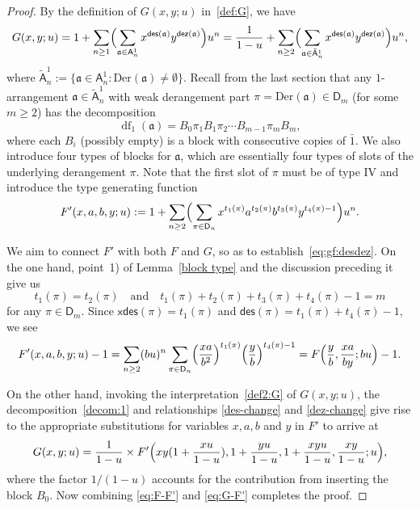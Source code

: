 \documentclass[12pt]{amsart} %
\numberwithin{equation}{section}
\theoremstyle{plain}
\theoremstyle{definition}
\newcommand\A{\mathsf{A}}
\newcommand\D{\mathsf{D}}
\def\dez{\mathsf{dez}}
\def\xdes{\mathsf{xdes}}
\def\Der{\mathrm{Der}}
\def\des{\mathsf{des}}
\def\a{\mathfrak{a}}
\def\df{\operatorname{df}}
\def\neg#1{{{{\bar#1}}}}
\begin{document}
\begin{proof}
By the definition of $G(x,y;u)$ in~\eqref{def:G}, we have 
\begin{equation}\label{def2:G}
G(x,y; u)=1+\sum_{n\geq 1} \Bigl( \sum_{\a\in\A^1_n} 
	 x^{\des(\a)} y^{\dez(\a)} \Bigr) u^n=\frac{1}{1-u}+\sum_{n\geq 2} \Bigl( \sum_{\a\in\tilde{\A}^1_n} 
	 x^{\des(\a)} y^{\dez(\a)} \Bigr) u^n,
\end{equation}
where $\tilde{\A}^1_n:=\{\a\in\A^1_n: \Der(\a)\neq\emptyset\}$. 
Recall from the last section that any $1$-arrangement $\a\in\tilde{\A}^1_n$ with weak derangement part $\pi=\Der(\a)\in\D_m$ (for some $m\geq2$) has the decomposition 
\begin{equation}\label{decom:1}
\df_1(\a)=B_0\pi_1B_1\pi_2\cdots B_{m-1}\pi_m B_m,
\end{equation}
where each $B_i$ (possibly empty) is  a block with consecutive copies of $\neg1$. We also introduce four types of blocks for $\a$, which are essentially four types of slots of the underlying derangement $\pi$. Note that the first slot of $\pi$ must be of type IV and introduce the type generating function
$$
F'(x,a,b,y; u):=1+\sum_{n\geq 2} \Bigl( \sum_{\pi\in \D_n} 
	 x^{t_1(\pi)} a^{t_2(\pi)} b^{t_3(\pi)} y^{t_4(\pi)-1} \Bigr) u^n.
$$

We aim to connect $F'$ with both $F$ and $G$, so as to establish~\eqref{eq:gf:desdez}.
On the one hand, point~1) of Lemma~\ref{block type} and the discussion preceding it give us
$$t_1(\pi)=t_2(\pi) \quad\text{and}\quad t_1(\pi)+t_2(\pi)+t_3(\pi)+t_4(\pi)-1=m$$
for any $\pi\in\D_m$. Since $\xdes(\pi)=t_1(\pi)$ and $\des(\pi)=t_1(\pi)+t_4(\pi)-1$, we see
\begin{equation}\label{eq:F-F'}
F'(x,a,b,y; u)-1 =\sum_{n\geq 2}  (bu)^n \sum_{\pi\in \D_n} 
	\Bigl(\frac{xa}{b^2}\Bigr)^{t_1(\pi)} \Bigl(\frac{y}{b}\Bigr)^{t_4(\pi)-1} 
	=F\Bigl(\frac{y}{b},\frac{xa}{by};bu\Bigr)-1.
\end{equation}

 On the other hand, invoking the interpretation~\eqref{def2:G} of $G(x,y;u)$, the decomposition~\eqref{decom:1} and relationships  \eqref{des-change} and \eqref{dez-change} give rise to the appropriate substitutions for variables $x,a,b$ and $y$ in $F'$ to arrive at
\begin{equation}\label{eq:G-F'}
G(x,y;u)=\frac{1}{1-u}\times F'\Bigl(xy(1+\frac{xu}{1-u}),1+\frac{yu}{1-u},1+\frac{xyu}{1-u},\frac{xy}{1-u}; u\Bigr),
\end{equation}
where the factor $1/(1-u)$ accounts for the contribution from inserting the block $B_0$. 
Now combining \eqref{eq:F-F'} and \eqref{eq:G-F'} completes the proof.
\end{proof}
\end{document}
